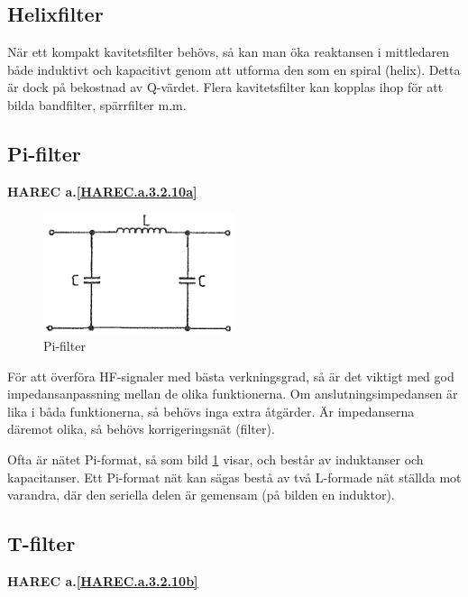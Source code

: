\subsection{Helixfilter}

När ett kompakt kavitetsfilter behövs, så kan man öka reaktansen i mittledaren
både induktivt och kapacitivt genom att utforma den som en spiral (helix).
Detta är dock på bekostnad av Q-värdet.
Flera kavitetsfilter kan kopplas ihop för att bilda bandfilter, spärrfilter m.m.

\subsection{Pi-filter}
\textbf{HAREC a.\ref{HAREC.a.3.2.10a}\label{myHAREC.a.3.2.10a}}

\begin{figure}
\includegraphics[width=0.5\textwidth]{images/cropped_pdfs/bild_2_3-32.pdf}
\caption{Pi-filter}
\label{fig:BildII3-32}
\end{figure}

För att överföra HF-signaler med bästa verkningsgrad, så är det viktigt med god
impedansanpassning mellan de olika funktionerna.
Om anslutningsimpedansen är lika i båda funktionerna, så behövs inga extra
åtgärder.
Är impedanserna däremot olika, så behövs korrigeringsnät (filter).

Ofta är nätet Pi-format, så som bild \ref{fig:BildII3-32} visar, och består av
induktanser och kapacitanser.
Ett Pi-format nät kan sägas bestå av två L-formade nät ställda mot varandra, där
den seriella delen är gemensam (på bilden en induktor).

\subsection{T-filter}
\textbf{HAREC a.\ref{HAREC.a.3.2.10b}\label{myHAREC.a.3.2.10b}}

